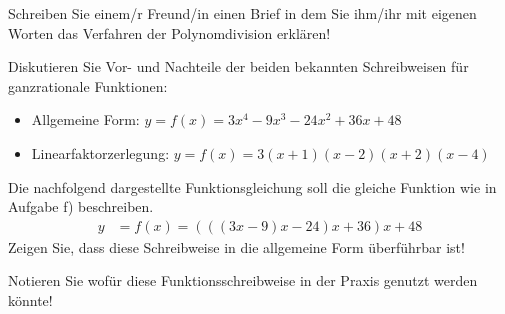 \begin{aufgaben}
\cleardoublepage

\item Schreiben Sie einem/r Freund/in einen Brief in dem Sie ihm/ihr mit eigenen Worten das Verfahren der Polynomdivision erklären!
\vspace*{7cm}
\item Diskutieren Sie Vor- und Nachteile der beiden bekannten Schreibweisen für ganzrationale Funktionen:
\begin{itemize}
\item Allgemeine Form: $y = f(x)=3 x^4 - 9 x^3 - 24 x^2 + 36 x + 48$
\item Linearfaktorzerlegung: $y = f(x)=3(x+1)(x-2)(x+2)(x-4)$
\end{itemize}
\vfill
\item Die nachfolgend dargestellte Funktionsgleichung soll die gleiche Funktion wie in Aufgabe f) beschreiben.
\begin{align*}
y &= f(x)=(((3x-9)x-24)x+36)x+48
\end{align*}
Zeigen Sie, dass diese Schreibweise in die allgemeine Form überführbar ist!
\vspace*{5cm}

Notieren Sie wofür diese Funktionsschreibweise in der Praxis genutzt werden könnte!

\vspace*{3cm}
\end{aufgaben}